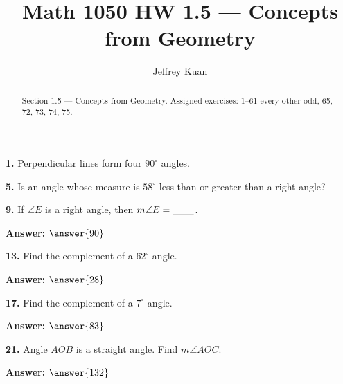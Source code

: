 \documentclass{ximera}
\author{Jeffrey Kuan}
\title{Math 1050 HW 1.5 --- Concepts from Geometry}
\begin{document}
\begin{abstract}
    Section 1.5 --- Concepts from Geometry.
    Assigned exercises: 1–61 every other odd, 65, 72, 73, 74, 75.
\end{abstract}

\maketitle

\begin{problem}
\textbf{1.} Perpendicular lines form four $90^\circ$ angles.

\begin{multipleChoice}
\end{multipleChoice}
\end{problem}

\begin{problem}
\textbf{5.} Is an angle whose measure is $58^\circ$ less than or greater than a right angle?

\begin{multipleChoice}
\end{multipleChoice}
\end{problem}

\begin{problem}
\textbf{9.} If $\angle E$ is a right angle, then $m\angle E = \underline{\hspace{2.2em}}$.

\textbf{Answer:} $\answer{90}$
\end{problem}

\begin{problem}
\textbf{13.} Find the complement of a $62^\circ$ angle.

\textbf{Answer:} $\answer{28}$
\end{problem}

\begin{problem}
\textbf{17.} Find the complement of a $7^\circ$ angle.

\textbf{Answer:} $\answer{83}$
\end{problem}

\begin{problem}
\textbf{21.} Angle $AOB$ is a straight angle. Find $m\angle AOC$.

\textbf{Answer:} $\answer{132}$
\end{problem}
\end{document}
